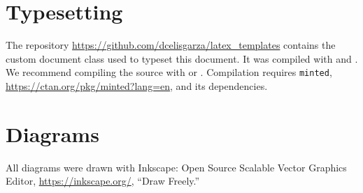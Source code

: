 \section{Typesetting}
\label{s:typeset}

The repository \href{https://github.com/dcelisgarza/latex_templates}{https://github.com/dcelisgarza/latex\_templates} contains the custom document class used to typeset this document. It was compiled with  and . We recommend compiling the source with  or . Compilation requires \texttt{minted}, \href{https://ctan.org/pkg/minted?lang=en}{https://ctan.org/pkg/minted?lang=en}, and its dependencies.
\section{Diagrams}
\label{s:diag}

All diagrams were drawn with Inkscape: Open Source Scalable Vector Graphics Editor, \href{https://inkscape.org/}{https://inkscape.org/}, ``Draw Freely.''
\savearabiccounter

